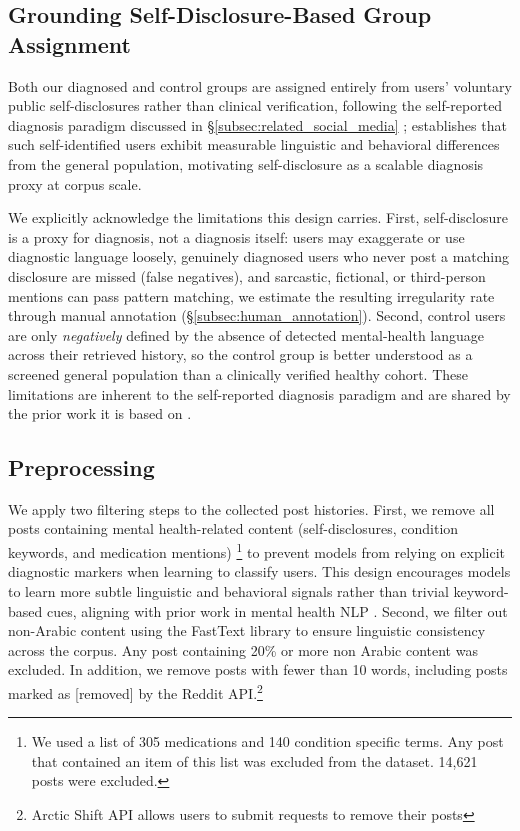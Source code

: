 \documentclass[letterpaper]{article} %
\begin{document}
\subsection{Grounding Self-Disclosure-Based Group Assignment}
\label{subsec:self_disclosure_grounding}

Both our diagnosed and control groups are assigned entirely from users'
voluntary public self-disclosures rather than clinical verification,
following the self-reported diagnosis paradigm discussed in
\S\ref{subsec:related_social_media} \citep{coppersmith2014quantifying,
coppersmith2015clpsych, cohan-etal-2018-smhd}; \citet{de2013predicting}
establishes that such self-identified users exhibit measurable
linguistic and behavioral differences from the general population,
motivating self-disclosure as a scalable diagnosis proxy at corpus
scale.

We explicitly acknowledge the limitations this design carries. First,
self-disclosure is a proxy for diagnosis, not a diagnosis itself: users
may exaggerate or use diagnostic language loosely, genuinely diagnosed
users who never post a matching disclosure are missed (false
negatives), and sarcastic, fictional, or third-person mentions can pass
pattern matching, we estimate the resulting irregularity rate through
manual annotation (\S\ref{subsec:human_annotation}). Second, control
users are only \textit{negatively} defined by the absence of detected
mental-health language across their retrieved history, so the control
group is better understood as a screened general population than a
clinically verified healthy cohort. These limitations are inherent to
the self-reported diagnosis paradigm and are shared by the prior work
it is based on \citep{coppersmith2014quantifying, cohan-etal-2018-smhd}.

\subsection{Preprocessing}

We apply two filtering steps to the collected post histories. First, we remove all posts containing mental health-related content (self-disclosures, condition keywords, and medication mentions) \footnote{We used a list of 305 medications and 140 condition specific terms. Any post that contained an item of this list was excluded from the dataset. 14,621 posts were excluded.} to prevent models from relying on explicit diagnostic markers when learning to classify users. This design encourages models to learn more subtle linguistic and behavioral signals rather than trivial keyword-based cues, aligning with prior work in mental health NLP \cite{cohan-etal-2018-smhd}. Second, we filter out non-Arabic content using the FastText library to ensure linguistic consistency across the corpus. Any post containing 20\% or more non Arabic content was excluded. In addition, we remove posts with fewer than 10 words, including posts marked as [removed] by the Reddit API.\footnote{Arctic Shift API allows users to submit requests to remove their posts}
\end{document}
